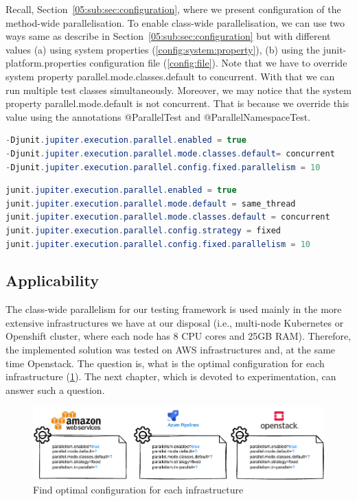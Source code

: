 Recall, Section~\ref{05:sub:sec:configuration}, where we present configuration of the method-wide parallelisation.
To enable class-wide parallelisation, we can use two ways same as describe in Section~\ref{05:sub:sec:configuration} but
with different values (a) using system properties (\ref{config:system:property}),
(b) using the junit-platform.properties configuration file (\ref{config:file}).
Note that we have to override system property parallel.mode.classes.default to concurrent.
With that we can run multiple test classes simultaneously.
Moreover, we may notice that the system property parallel.mode.default is not concurrent.
That is because we override this value using the annotations @ParallelTest and @ParallelNamespaceTest.
\begin{lstlisting}[language= Java,label=config:system:property,caption=(a) Configuration via system properties,frame=tb]
-Djunit.jupiter.execution.parallel.enabled = true
-Djunit.jupiter.execution.parallel.mode.classes.default= concurrent
-Djunit.jupiter.execution.parallel.config.fixed.parallelism = 10
\end{lstlisting}
\begin{lstlisting}[language=Java,label=config:file,caption=(b) Configuration via file,frame = tb]
junit.jupiter.execution.parallel.enabled = true
junit.jupiter.execution.parallel.mode.default = same_thread
junit.jupiter.execution.parallel.mode.classes.default = concurrent
junit.jupiter.execution.parallel.config.strategy = fixed
junit.jupiter.execution.parallel.config.fixed.parallelism = 10
\end{lstlisting}

\subsection{Applicability}

The class-wide parallelism for our testing framework is used mainly in the more extensive infrastructures we have at our disposal
(i.e., multi-node Kubernetes or Openshift cluster, where each node has 8 CPU cores and 25GB RAM).
Therefore, the implemented solution was tested on AWS infrastructures and, at the same time Openstack.
The question is, what is the optimal configuration for each infrastructure (\ref{07:fig:optimal:configuration:infrastructure}).
The next chapter, which is devoted to experimentation, can answer such a question.

\begin{figure}[!ht]
\centering
\includegraphics[scale=1]{obrazky-figures/07-implementation/01-configuration}
\caption{Find optimal configuration for each infrastructure}
\label{07:fig:optimal:configuration:infrastructure}
\end{figure}

